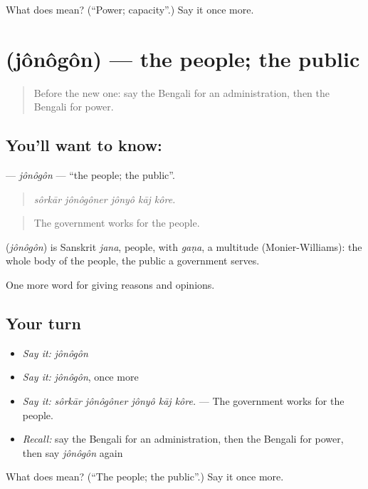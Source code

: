 \begin{tcolorbox}[breakable,colback=teal!4,colframe=teal!35!black,title={Before you move on}]
What does  mean? (\textquotedblleft{}Power; capacity\textquotedblright{}.) Say it once more.
\end{tcolorbox}
\section[\texorpdfstring{\bn{জনগণ} (jônôgôn)}{জনগণ (jônôgôn)}]{ (jônôgôn) — the people; the public}

\label{lesson:BN-C344-jonogon}



\begin{quote}
Before the new one: say the Bengali for an administration, then the Bengali for power.
\end{quote}

\subsection*{You'll want to know: }
\textbf{} — \emph{jônôgôn} — \textquotedblleft{}the people; the public\textquotedblright{}.

\begin{quote}
    
\end{quote}

\begin{quote}
\emph{sôrkār jônôgôner jônyô kāj kôre.}
\end{quote}

\begin{quote}
The government works for the people.
\end{quote}

\begin{cousinweb}
\textbf{} (\emph{jônôgôn}) is Sanskrit \emph{jana}, people, with \emph{gaṇa}, a multitude (Monier-Williams): the whole body of the people, the public a government serves.
\end{cousinweb}

\begin{grammarlens}[title={What you've built}]
One more word for giving reasons and opinions.
\end{grammarlens}

\subsection*{Your turn}
\begin{itemize}
\raggedright
  \item \emph{Say it:} \emph{jônôgôn}
  \item \emph{Say it:} \emph{jônôgôn}, once more
  \item \emph{Say it:} \emph{sôrkār jônôgôner jônyô kāj kôre.} — The government works for the people.
  \item \emph{Recall:} say the Bengali for an administration, then the Bengali for power, then say \emph{jônôgôn} again
\end{itemize}

\begin{tcolorbox}[breakable,colback=teal!4,colframe=teal!35!black,title={Before you move on}]
What does  mean? (\textquotedblleft{}The people; the public\textquotedblright{}.) Say it once more.
\end{tcolorbox}
